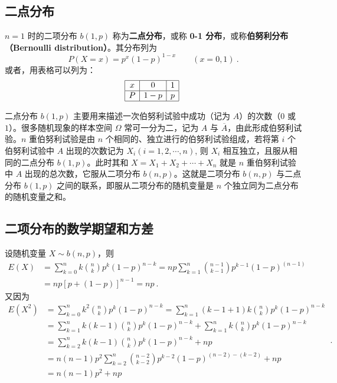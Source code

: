 \subsection{二点分布}
$n=1$ 时的二项分布 $b (1 ,p)$ 称为\textbf{二点分布}，或称 \textbf{0-1 分布}，或称\textbf{伯努利分布（Bernoulli distribution）}。其分布列为
\begin{equation}
P(X=x)=p^{x}(1-p)^{1-x} \qquad (x=0,1)~.
\end{equation}
或者，用表格可以列为：
\begin{equation}
\begin{array}{|c|c|c|}\hline x & 0 & 1 \\ \hline P & 1-p & p \\ \hline  \end{array}~
\end{equation}

二点分布 $b(1 ,p) $ 主要用来描述一次伯努利试验中成功（记为 $A$）的次数（$0$ 或 $1$）。很多随机现象的样本空间 $\Omega$ 常可一分为二，记为 $A $ 与 $\overline A$，由此形成伯努利试验。$n $ 重伯努利试验是由 $n $ 个相同的、独立进行的伯努利试验组成，若将第 $i $ 个伯努利试验中 $A $ 出现的次数记为 $X_i (i= 1,2, \cdots, n)$, 则 $X_i$ 相互独立，且服从相同的二点分布 $b(1 ,p)$。此时其和 $X=X_1+X_2+\cdots+X_n$ 就是 $n $ 重伯努利试验中 $A $ 出现的总次数，它服从二项分布 $b(n,p)$。这就是二项分布 $b (n ,p) $ 与二点分布 $b(1,p)$ 之间的联系，即服从二项分布的随机变量是 $n$ 个独立同为二点分布的随机变量之和。

\subsection{二项分布的数学期望和方差}

设随机变量 $X\sim b(n,p)$，则
\begin{equation}
\begin{aligned} E(X) &=\sum_{k=0}^{n} k\binom{n}{k} p^{k}(1-p)^{n-k}=n p \sum_{k=1}^{n}\binom{n-1}{k-1} p^{k-1}(1-p)^{(n-1)} \\ &=n p[p+(1-p)]^{n-1}=n p~.\end{aligned}
\end{equation}
又因为
\begin{equation}
\begin{aligned} E\left(X^{2}\right) &=\sum_{k=0}^{n} k^{2}\binom{n}{k} p^{k}(1-p)^{n-k}=\sum_{k=1}^{n}(k-1+1) k\binom{n}{k} p^{k}(1-p)^{n-k} \\ &=\sum_{k=1}^{n} k(k-1)\binom{n}{k} p^{k}(1-p)^{n-k}+\sum_{k=1}^{n} k\binom{n}{k} p^{k}(1-p)^{n-k} \\ &=\sum_{k=2}^{n} k(k-1)\binom{n}{k} p^{k}(1-p)^{n-k}+n p \\ &=n(n-1) p^{2} \sum_{k=2}^{n}\binom{n-2}{k-2} p^{k-2}(1-p)^{(n-2)-(k-2)}+n p \\ &=n(n-1) p^{2}+n p \end{aligned}~.
\end{equation}

